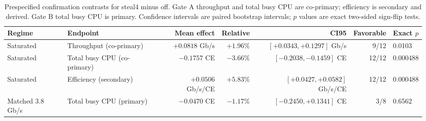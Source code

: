 \begin{table}[t]
  \caption{Prespecified confirmation contrasts for steal4 minus off. Gate A
  throughput and total busy CPU are co-primary; efficiency is secondary and
  derived. Gate B total busy CPU is primary. Confidence intervals are paired
  bootstrap intervals; $p$ values are exact two-sided sign-flip tests.}
  \label{tab:confirmation-results}
  \small
  \centering
  \begin{tabular}{@{}llrrrrl@{}}
    \toprule
    Regime & Endpoint & Mean effect & Relative & CI95 & Favorable & Exact $p$ \\
    \midrule
    Saturated & Throughput (co-primary) &
      $+0.0818$ Gb/s & $+1.96\%$ &
      $[+0.0343,+0.1297]$ Gb/s & 9/12 & 0.0103 \\
    Saturated & Total busy CPU (co-primary) &
      $-0.1757$ CE & $-3.66\%$ &
      $[-0.2038,-0.1459]$ CE & 12/12 & 0.000488 \\
    Saturated & Efficiency (secondary) &
      $+0.0506$ Gb/s/CE & $+5.83\%$ &
      $[+0.0427,+0.0582]$ Gb/s/CE & 12/12 & 0.000488 \\
    Matched 3.8 Gb/s & Total busy CPU (primary) &
      $-0.0470$ CE & $-1.17\%$ &
      $[-0.2450,+0.1341]$ CE & 3/8 & 0.6562 \\
    \bottomrule
  \end{tabular}
\end{table}
